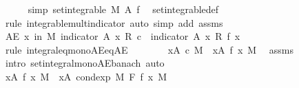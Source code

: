 \begin{isabellebody}
\ \ \ \ \isamarkupfalse%
\ {\isacharbrackleft}{\kern0pt}simp{\isacharbrackright}{\kern0pt}{\isacharcolon}{\kern0pt}\ {\isachardoublequoteopen}set{\isacharunderscore}{\kern0pt}integrable\ M\ A\ f{\isachardoublequoteclose}\ \isamarkupfalse%
\ set{\isacharunderscore}{\kern0pt}integrable{\isacharunderscore}{\kern0pt}def\ \isamarkupfalse%
\ {\isacharparenleft}{\kern0pt}rule\ integrable{\isacharunderscore}{\kern0pt}mult{\isacharunderscore}{\kern0pt}indicator{\isacharcomma}{\kern0pt}\ auto\ simp\ add{\isacharcolon}{\kern0pt}\ assms{\isacharparenleft}{\kern0pt}{}{\isacharparenright}{\kern0pt}{\isacharparenright}{\kern0pt}\isanewline
\ \ \ \ \isamarkupfalse%
\ {\isachardoublequoteopen}AE\ x\ in\ M{\isachardot}{\kern0pt}\ indicator\ A\ x\ {\isacharasterisk}{\kern0pt}\isactrlsub R\ c\ {\isacharequal}{\kern0pt}\ indicator\ A\ x\ {\isacharasterisk}{\kern0pt}\isactrlsub R\ f\ x{\isachardoublequoteclose}\isanewline
\ \ \ \ \isamarkupfalse%
\ {\isacharparenleft}{\kern0pt}rule\ integral{\isacharunderscore}{\kern0pt}eq{\isacharunderscore}{\kern0pt}mono{\isacharunderscore}{\kern0pt}AE{\isacharunderscore}{\kern0pt}eq{\isacharunderscore}{\kern0pt}AE{\isacharparenright}{\kern0pt}\isanewline
\ \ \ \ \ \ \isamarkupfalse%
\ {\isachardoublequoteopen}{\isacharparenleft}{\kern0pt}{\isasymintegral}x{\isasymin}A{\isachardot}{\kern0pt}\ c\ {\isasympartial}M{\isacharparenright}{\kern0pt}\ {\isasymle}\ {\isacharparenleft}{\kern0pt}{\isasymintegral}x{\isasymin}A{\isachardot}{\kern0pt}\ f\ x\ {\isasympartial}M{\isacharparenright}{\kern0pt}{\isachardoublequoteclose}\ \isamarkupfalse%
\ assms{\isacharparenleft}{\kern0pt}{}{\isacharparenright}{\kern0pt}\ \isamarkupfalse%
\ {\isacharparenleft}{\kern0pt}intro\ set{\isacharunderscore}{\kern0pt}integral{\isacharunderscore}{\kern0pt}mono{\isacharunderscore}{\kern0pt}AE{\isacharunderscore}{\kern0pt}banach{\isacharparenright}{\kern0pt}\ auto\isanewline
\ \ \ \ \ \ \isamarkupfalse%
\isanewline
\ \ \ \ \ \ \isacommand{{\isacharbraceleft}{\kern0pt}}\isamarkupfalse%
\isanewline
\ \ \ \ \ \ \ \ \isamarkupfalse%
\ {\isachardoublequoteopen}{\isacharparenleft}{\kern0pt}{\isasymintegral}x{\isasymin}A{\isachardot}{\kern0pt}\ f\ x\ {\isasympartial}M{\isacharparenright}{\kern0pt}\ {\isacharequal}{\kern0pt}\ {\isacharparenleft}{\kern0pt}{\isasymintegral}x{\isasymin}A{\isachardot}{\kern0pt}\ cond{\isacharunderscore}{\kern0pt}exp\ M\ F\ f\ x\ {\isasympartial}M{\isacharparenright}{\kern0pt}{\isachardoublequoteclose}\ \isamarkupfalse%

\end{isabellebody}

